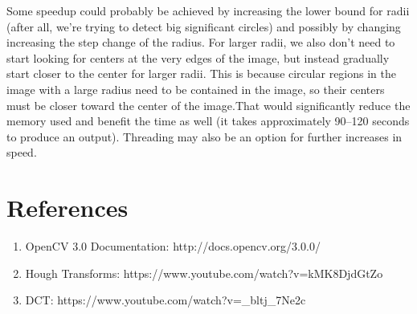 \documentclass[12pt]{article}
\begin{document}
Some speedup could probably be achieved by increasing the
lower bound for radii (after all, we're trying to detect big significant
circles) and possibly by changing increasing the step change of the radius. For
larger radii, we also don't need to start looking for centers at the very edges
of the image, but instead gradually start closer to the center for larger radii.
This is because circular regions in the image with a large radius need to be
contained in the image, so their centers must be closer toward the center of the
image.That would significantly reduce the memory used and benefit the time as well (it
takes approximately 90--120 seconds to produce an output). Threading may also be
an option for further increases in speed.

\section{References}

\begin{enumerate}
\item OpenCV 3.0 Documentation: http://docs.opencv.org/3.0.0/\\
\item Hough Transforms: https://www.youtube.com/watch?v=kMK8DjdGtZo\\
\item DCT: https://www.youtube.com/watch?v={\_}bltj{\_}7Ne2c
\end{enumerate}
\end{document}
